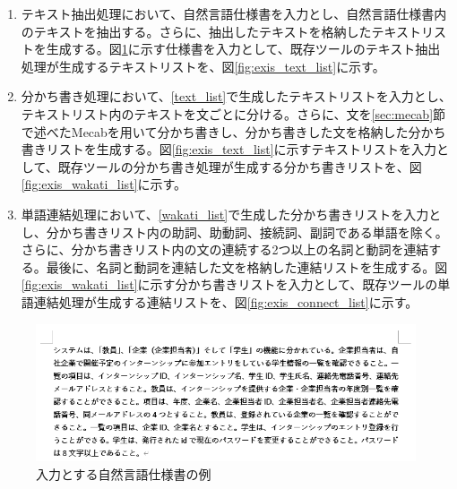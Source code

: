 \begin{enumerate}
    \item テキスト抽出処理において、自然言語仕様書を入力とし、自然言語仕様書内のテキストを抽出する。さらに、抽出したテキストを格納したテキストリストを生成する。図\ref{fig:exis_spec_example}に示す仕様書を入力として、既存ツールのテキスト抽出処理が生成するテキストリストを、図\ref{fig:exis_text_list}に示す。
    \label{text_list}
    \item 分かち書き処理において、\ref{text_list}で生成したテキストリストを入力とし、テキストリスト内のテキストを文ごとに分ける。さらに、文を\ref{sec:mecab}節で述べたMecabを用いて分かち書きし、分かち書きした文を格納した分かち書きリストを生成する。図\ref{fig:exis_text_list}に示すテキストリストを入力として、既存ツールの分かち書き処理が生成する分かち書きリストを、図\ref{fig:exis_wakati_list}に示す。
    \label{wakati_list}
    \item 単語連結処理において、\ref{wakati_list}で生成した分かち書きリストを入力とし、分かち書きリスト内の助詞、助動詞、接続詞、副詞である単語を除く。さらに、分かち書きリスト内の文の連続する2つ以上の名詞と動詞を連結する。最後に、名詞と動詞を連結した文を格納した連結リストを生成する。図\ref{fig:exis_wakati_list}に示す分かち書きリストを入力として、既存ツールの単語連結処理が生成する連結リストを、図\ref{fig:exis_connect_list}に示す。
\end{enumerate}

\begin{figure}[tp]
    \begin{center}
        \includegraphics[width=1.0\columnwidth]{image/exis_spec_example.png}
        \caption{入力とする自然言語仕様書の例}
        \label{fig:exis_spec_example}
    \end{center}
\end{figure}

